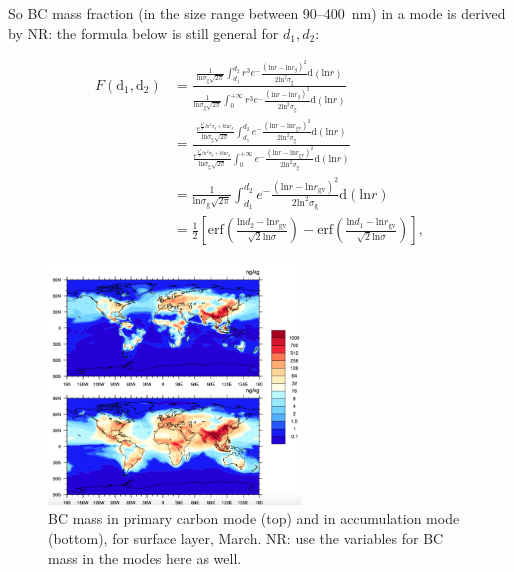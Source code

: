 \documentclass[11pt]{article}
\newcommand{\nrtodo}[1]{{\color{blue} NR: #1}}
\begin{document}
\noindent So BC mass fraction (in the size range between 90--400~nm)
in a mode is derived by \nrtodo{the formula below is still general for
  $d_1, d_2$}:

\begin{align*}
F(\text{d}_{1}, \text{d}_{2}) &= \frac{\frac{1}{\text{ln}\sigma_{\text{g}}\sqrt{2\pi}}\int_{d_{1}}^{d_{2}}r^3e^-\frac{(\text{ln}r - \text{ln}r_{g})^2}{2\text{ln}^2\sigma_{\text{g}}}\text{d}(\text{ln}r)}
{\frac{1}{\text{ln}\sigma_{\text{g}}\sqrt{2\pi}}\int_{0}^{+\infty}r^3e^-\frac{(\text{ln}r - \text{ln}r_{g})^2}{2\text{ln}^2\sigma_{\text{g}}}\text{d}(\text{ln}r)}  \\
&=\frac{\frac{e^{\frac{k^2}{2}ln^2\sigma_{g}+k\text{ln}r_{g}}}{\text{ln}\sigma_{\text{g}}\sqrt{2\pi}}\int_{d_{1}}^{d_{2}}e^-\frac{(\text{ln}r - \text{ln}r_{\text{gv}})^2}{2\text{ln}^2\sigma_{\text{g}}}\text{d}(\text{ln}r)}{\frac{e^{\frac{k^2}{2}ln^2\sigma_{g}+k\text{ln}r_{g}}}{\text{ln}\sigma_{\text{g}}\sqrt{2\pi}}\int_{0}^{+\infty}e^-\frac{(\text{ln}r - \text{ln}r_{\text{gv}})^2}{2\text{ln}^2\sigma_{\text{g}}}\text{d}(\text{ln}r)}\\
&=\frac{1}{\text{ln}\sigma_{\text{g}}\sqrt{2\pi}}\int_{d_{1}}^{d_{2}}e^-\frac{(\text{ln}r - \text{ln}r_{\text{gv}})^2}{2\text{ln}^2\sigma_{\text{g}}}\text{d}(\text{ln}r) \\
&=\frac{1}{2}[\text{erf}(\frac{\text{ln}d_{2} - \text{ln}r_{\text{gv}}}{\sqrt{2}\text{ln}\sigma})-\text{erf}(\frac{\text{ln}d_{1} - \text{ln}r_{\text{gv}}}{\sqrt{2}\text{ln}\sigma})],
\end{align*}




\bigskip
\bigskip
\bigskip
\begin{figure}[!h] 
	\begin{center}
		\includegraphics[width = 0.6\textwidth]{Rplot01}
		\caption[]{\label{fig_P1}BC mass in primary carbon mode (top) and in accumulation mode (bottom), for surface layer, March. \nrtodo{use the variables for BC mass in the modes here as well.}}
	\end{center}
\end{figure}
\end{document}
